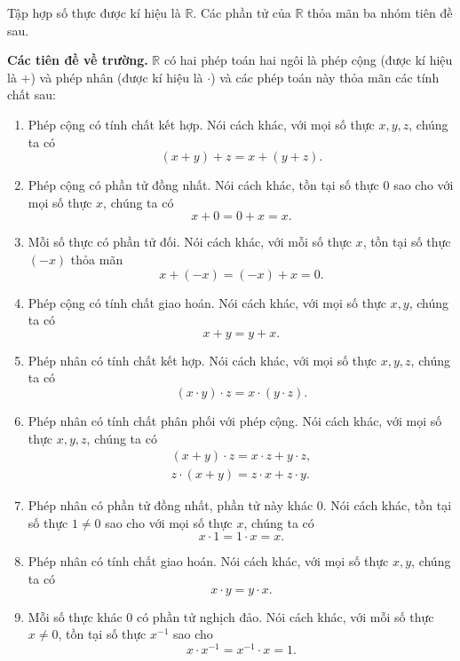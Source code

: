 \begin{axiom}
	Tập hợp số thực được kí hiệu là $\mathbb{R}$. Các phần tử của $\mathbb{R}$ thỏa mãn ba nhóm tiên đề sau.

	\textbf{Các tiên đề về trường.} $\mathbb{R}$ có hai phép toán hai ngôi là phép cộng (được kí hiệu là $+$) và phép nhân (được kí hiệu là $\cdot$) và các phép toán này thỏa mãn các tính chất sau:
	\begin{enumerate}[label={(\roman*)}]
		\item Phép cộng có tính chất kết hợp. Nói cách khác, với mọi số thực $x, y, z$, chúng ta có
		      \[
			      (x + y) + z = x + (y + z).
		      \]
		\item Phép cộng có phần tử đồng nhất. Nói cách khác, tồn tại số thực $0$ sao cho với mọi số thực $x$, chúng ta có
		      \[
			      x + 0 = 0 + x = x.
		      \]
		\item Mỗi số thực có phần tử đối. Nói cách khác, với mỗi số thực $x$, tồn tại số thực $(-x)$ thỏa mãn
		      \[
			      x + (-x) = (-x) + x = 0.
		      \]
		\item Phép cộng có tính chất giao hoán. Nói cách khác, với mọi số thực $x, y$, chúng ta có
		      \[
			      x + y = y + x.
		      \]
		\item Phép nhân có tính chất kết hợp. Nói cách khác, với mọi số thực $x, y, z$, chúng ta có
		      \[
			      (x \cdot y) \cdot z = x \cdot (y \cdot z).
		      \]
		\item Phép nhân có tính chất phân phối với phép cộng. Nói cách khác, với mọi số thực $x, y, z$, chúng ta có
		      \[
			      \begin{split}
				      (x + y)\cdot z = x\cdot z + y\cdot z, \\
				      z\cdot (x + y) = z\cdot x + z\cdot y.
			      \end{split}
		      \]

		\item Phép nhân có phần tử đồng nhất, phần tử này khác $0$. Nói cách khác, tồn tại số thực $1\ne 0$ sao cho với mọi số thực $x$, chúng ta có
		      \[
			      x \cdot 1 = 1 \cdot x = x.
		      \]
		\item Phép nhân có tính chất giao hoán. Nói cách khác, với mọi số thực $x, y$, chúng ta có
		      \[
			      x\cdot y = y\cdot x.
		      \]
		\item Mỗi số thực khác $0$ có phần tử nghịch đảo. Nói cách khác, với mỗi số thực $x\ne 0$, tồn tại số thực $x^{-1}$ sao cho
		      \[
			      x\cdot x^{-1} = x^{-1}\cdot x = 1.
		      \]
	\end{enumerate}


\end{axiom}
